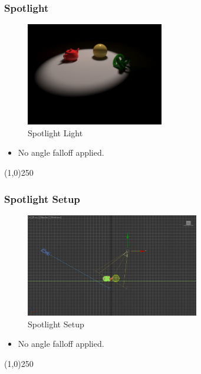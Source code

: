 \begin{frame}
	\frametitle{Spotlight}
	\begin{figure}
		\centering
		\includegraphics[height=4.5cm]{./Lights/Spotlight}
		\caption{Spotlight Light}
		\label{fig:SpotlightLight}
	\end{figure}
	\begin{itemize}
		\item No angle falloff applied.
	\end{itemize}
\end{frame}
\begin{center}\line(1,0){250}\end{center}

\begin{frame}
	\frametitle{Spotlight Setup}
	\begin{figure}
		\centering
		\includegraphics[height=4.5cm]{./Lights/SpotlightSetup}
		\caption{Spotlight Setup}
		\label{fig:SpotlightSetup}
	\end{figure}
	\begin{itemize}
		\item No angle falloff applied.
	\end{itemize}
\end{frame}
\begin{center}\line(1,0){250}\end{center}


